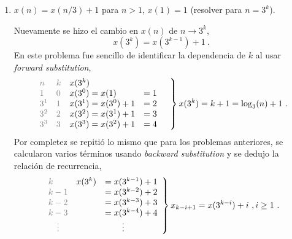 \begin{enumerate}[label=\textbf{\alph*.}]
    \item $x(n) = x(n/3) + 1$ para $n > 1$, $x(1) = 1$ (resolver para $n = 3^k$).
    \begin{solution}
        Nuevamente se hizo el cambio en $x(n)$ de $n \to 3^k$,
        \begin{equation*}
            x(3^k) = x(3^{k - 1}) + 1\ .
        \end{equation*}
        En este problema fue sencillo de identificar la dependencia de $k$ al usar \textit{forward substitution},
        \begin{equation*}
            \begin{rcases}
                \begin{array}{l l l l}
                    \txtgray{n} & \txtgray{k} & x(3^k) & \\
                    \txtgray{1} & \txtgray{0} & x(3^0) = x(1) & = 1 \\
                    \txtgray{3^1} & \txtgray{1} & x(3^1) = x(3^0) + 1 & = 2 \\
                    \txtgray{3^2} & \txtgray{2} & x(3^2) = x(3^1) + 1 & = 3 \\
                    \txtgray{3^3} & \txtgray{3} & x(3^3) = x(3^2) + 1 & = 4
                \end{array} \quad
            \end{rcases}
            x(3^k) = k + 1 = \log_{3}(n) + 1\ .
        \end{equation*}
        Por completez se repitió lo mismo que para los problemas anteriores, se calcularon varios términos usando \textit{backward substitution} y se dedujo la relación de recurrencia,
        \begin{equation*}
            \begin{rcases}
                \begin{array}{l l l}
                    \txtgray{k} & x(3^k) & = x(3^{k - 1}) + 1 \\
                    \txtgray{k - 1} & & = x(3^{k - 2}) + 2 \\
                    \txtgray{k - 2} & & = x(3^{k - 3}) + 3 \\
                    \txtgray{k - 3} & & = x(3^{k - 4}) + 4 \\
                    \quad\txtgray\vdots & & \qquad \vdots
                \end{array}
            \end{rcases}
            x_{k - i + 1} = x(3^{k - i}) + i\ , i \geq 1\ .

\end{equation*}
\end{solution}
\end{enumerate}
